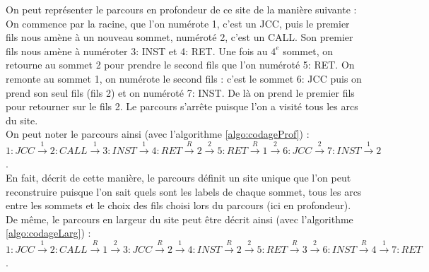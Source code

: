 On peut représenter le parcours en profondeur de ce site de la manière suivante : On commence par la racine, que l'on numérote 1, c'est un JCC, puis le premier fils nous amène à un nouveau sommet, numéroté 2, c'est un CALL. Son premier fils nous amène à numéroter 3: INST et 4: RET. Une fois au $4^e$ sommet, on retourne au sommet 2 pour prendre le second fils que l'on numéroté 5: RET. On remonte au sommet 1, on numérote le second fils : c'est le sommet 6: JCC puis on prend son seul fils (fils 2) et on numéroté 7: INST. De là on prend le premier fils pour retourner sur le fils 2. Le parcours s'arrête puisque l'on a visité tous les arcs du site.\\
On peut noter le parcours ainsi (avec l'algorithme \ref{algo:codageProf}) :\\
$1: JCC\xrightarrow{1} 2: CALL \xrightarrow{1} 3: INST \xrightarrow{1} 4: RET \xrightarrow{R} 2 \xrightarrow{2} 5: RET \xrightarrow{R} 1 \xrightarrow{2} 6: JCC \xrightarrow{2} 7:INST \xrightarrow{1} 2$.\\
En fait, décrit de cette manière, le parcours définit un site unique que l'on peut reconstruire puisque l'on sait quels sont les labels de chaque sommet, tous les arcs entre les sommets et le choix des fils choisi lors du parcours (ici en profondeur).\\
De même, le parcours en largeur du site peut être décrit ainsi (avec l'algorithme \ref{algo:codageLarg}) :\\
$1: JCC\xrightarrow{1} 2: CALL\xrightarrow{R} 1\xrightarrow{2} 3: JCC\xrightarrow{R} 2\xrightarrow{1} 4: INST\xrightarrow{R} 2\xrightarrow{2} 5: RET\xrightarrow{R} 3\xrightarrow{2} 6: INST\xrightarrow{R} 4\xrightarrow{1} 7: RET$.\\



